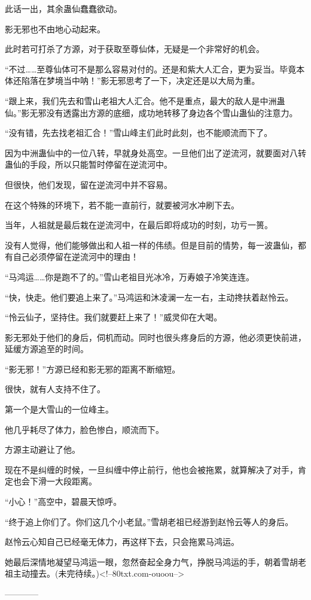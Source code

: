 \begin{this_body}
此话一出，其余蛊仙蠢蠢欲动。

影无邪也不由地心动起来。

此时若可打杀了方源，对于获取至尊仙体，无疑是一个非常好的机会。

“不过……至尊仙体可不是那么容易对付的。还是和紫大人汇合，更为妥当。毕竟本体还陷落在梦境当中呐！”影无邪思考了一下，决定还是以大局为重。

“跟上来，我们先去和雪山老祖大人汇合。他不是重点，最大的敌人是中洲蛊仙。”影无邪没有透露出方源的底细，成功地转移了身边各个雪山蛊仙的注意力。

“没有错，先去找老祖汇合！”雪山峰主们此时此刻，也不能顺流而下了。

因为中洲蛊仙中的一位八转，早就身处高空。一旦他们出了逆流河，就要面对八转蛊仙的手段，所以只能暂时停留在逆流河中。

但很快，他们发现，留在逆流河中并不容易。

在这个特殊的环境下，若不能一直前行，就要被河水冲刷下去。

当年，人祖就是最后栽在逆流河中，在最后即将成功的时刻，功亏一篑。

没有人觉得，他们能够做出和人祖一样的伟绩。但是目前的情势，每一波蛊仙，都有自己必须停留在逆流河中的理由！

“马鸿运……你是跑不了的。”雪山老祖目光冰冷，万寿娘子冷笑连连。

“快，快走。他们要追上来了。”马鸿运和沐凌澜一左一右，主动搀扶着赵怜云。

“怜云仙子，坚持住。我们就要赶上来了！”威灵仰在大喝。

影无邪处于他们的身后，伺机而动。同时也很头疼身后的方源，他必须更快前进，延缓方源追至的时间。

“影无邪！”方源已经和影无邪的距离不断缩短。

很快，就有人支持不住了。

第一个是大雪山的一位峰主。

他几乎耗尽了体力，脸色惨白，顺流而下。

方源主动避让了他。

现在不是纠缠的时候，一旦纠缠中停止前行，他也会被拖累，就算解决了对手，肯定也会下滑一大段距离。

“小心！”高空中，碧晨天惊呼。

“终于追上你们了。你们这几个小老鼠。”雪胡老祖已经游到赵怜云等人的身后。

赵怜云心知自己已经毫无体力，再这样下去，只会拖累马鸿运。

她最后深情地凝望马鸿运一眼，忽然奋起全身力气，挣脱马鸿运的手，朝着雪胡老祖主动撞去。(未完待续。)<!--80txt.com-ouoou-->

------------

\end{this_body}

